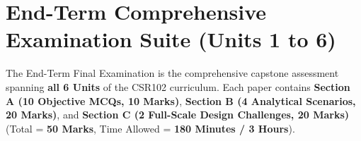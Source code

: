 \documentclass[a4paper,11pt,oneside,openany]{book}
\begin{document}
\newpage



\chapter{End-Term Comprehensive Examination Suite (Units 1 to 6)}
\label{chap:endterm}
\noindent
The End-Term Final Examination is the comprehensive capstone assessment spanning \textbf{all 6 Units} of the CSR102 curriculum. Each paper contains \textbf{Section A (10 Objective MCQs, 10 Marks)}, \textbf{Section B (4 Analytical Scenarios, 20 Marks)}, and \textbf{Section C (2 Full-Scale Design Challenges, 20 Marks)} (Total = \textbf{50 Marks}, Time Allowed = \textbf{180 Minutes / 3 Hours}).

\newpage


\end{document}
